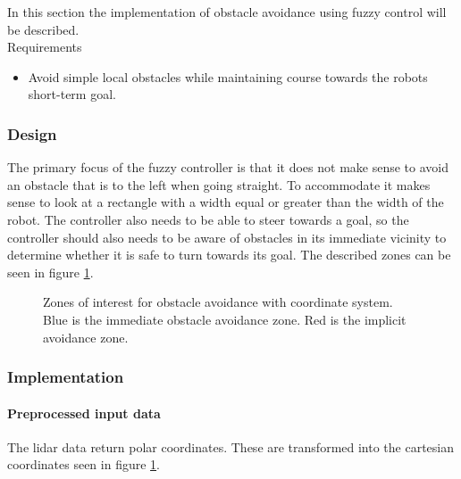 \documentclass[../../../Main.tex]{subfiles}
\begin{document}
In this section the implementation of obstacle avoidance using fuzzy control will be described.\\

Requirements
\begin{itemize}
	\item Avoid simple local obstacles while maintaining course towards
		the robots short-term goal.
\end{itemize}

\subsubsection{Design}%
\label{ssub:design}

The primary focus of the fuzzy controller is that it does not make sense to avoid an
obstacle that is to the left when going straight. To accommodate it makes sense to look at
a rectangle with a width equal or greater than the width of the robot. The controller also needs
to be able to steer towards a goal, so the controller should also needs to be aware of obstacles
in its immediate vicinity to determine whether it is safe to turn towards its goal.
The described zones can be seen in figure \ref{fig:ai:avoidance_area}.


\begin{figure}[h]
	\centering
	\def\svgwidth{0.2\textwidth}
	
	\caption{Zones of interest for obstacle avoidance with coordinate system.
	Blue is the immediate obstacle avoidance zone.
	Red is the implicit avoidance zone.}
	\label{fig:ai:avoidance_area}
\end{figure}


\subsubsection{Implementation}%
\label{ssub:implementation}

\paragraph{Preprocessed input data}%
\label{par:preprocessed_input_data}
The lidar data return polar coordinates. 
These are transformed into the cartesian coordinates seen in figure \ref{fig:ai:avoidance_area}.
\end{document}
